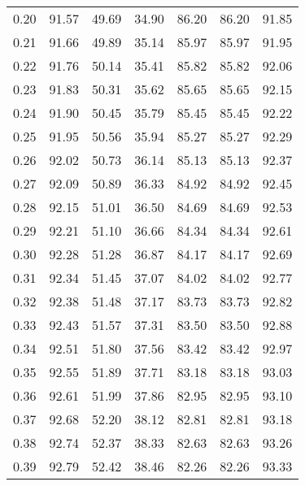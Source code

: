 \begin{tabular}{|c|c|c|c|c|c|c|}
      0.20 &     91.57 &     49.69 &      34.90 &   86.20 &      86.20 &         91.85 \\
      0.21 &     91.66 &     49.89 &      35.14 &   85.97 &      85.97 &         91.95 \\
      0.22 &     91.76 &     50.14 &      35.41 &   85.82 &      85.82 &         92.06 \\
      0.23 &     91.83 &     50.31 &      35.62 &   85.65 &      85.65 &         92.15 \\
      0.24 &     91.90 &     50.45 &      35.79 &   85.45 &      85.45 &         92.22 \\
      0.25 &     91.95 &     50.56 &      35.94 &   85.27 &      85.27 &         92.29 \\
      0.26 &     92.02 &     50.73 &      36.14 &   85.13 &      85.13 &         92.37 \\
      0.27 &     92.09 &     50.89 &      36.33 &   84.92 &      84.92 &         92.45 \\
      0.28 &     92.15 &     51.01 &      36.50 &   84.69 &      84.69 &         92.53 \\
      0.29 &     92.21 &     51.10 &      36.66 &   84.34 &      84.34 &         92.61 \\
      0.30 &     92.28 &     51.28 &      36.87 &   84.17 &      84.17 &         92.69 \\
      0.31 &     92.34 &     51.45 &      37.07 &   84.02 &      84.02 &         92.77 \\
      0.32 &     92.38 &     51.48 &      37.17 &   83.73 &      83.73 &         92.82 \\
      0.33 &     92.43 &     51.57 &      37.31 &   83.50 &      83.50 &         92.88 \\
      0.34 &     92.51 &     51.80 &      37.56 &   83.42 &      83.42 &         92.97 \\
      0.35 &     92.55 &     51.89 &      37.71 &   83.18 &      83.18 &         93.03 \\
      0.36 &     92.61 &     51.99 &      37.86 &   82.95 &      82.95 &         93.10 \\
      0.37 &     92.68 &     52.20 &      38.12 &   82.81 &      82.81 &         93.18 \\
      0.38 &     92.74 &     52.37 &      38.33 &   82.63 &      82.63 &         93.26 \\
      0.39 &     92.79 &     52.42 &      38.46 &   82.26 &      82.26 &         93.33 \\

\end{tabular}
